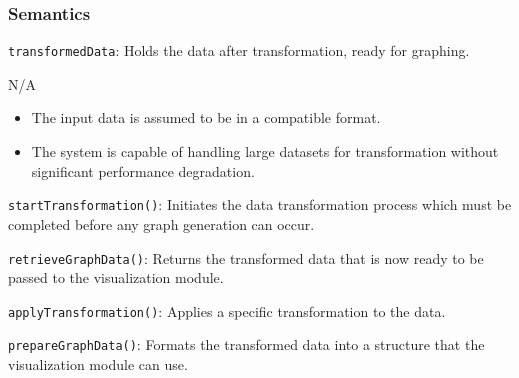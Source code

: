 \documentclass[12pt, titlepage]{article}
\begin{document}
\subsubsection{Semantics}
\begin{description}
  \item[State Variables:]
  \item \texttt{transformedData}: Holds the data after transformation, ready for graphing.
  \item[Environment Variables:] N/A

  \item[Assumptions:]
  \item
  \begin{itemize}
    \item The input data is assumed to be in a compatible format.
  \end{itemize}
  \item 
  \begin{itemize}
    \item The system is capable of handling large datasets for transformation without significant 
    performance degradation.
  \end{itemize}
  \item 

  \item[Access Routine Semantics:] 
  \item \texttt{startTransformation()}: Initiates the data transformation process which must be completed before 
  any graph generation can occur.
  \item \texttt{retrieveGraphData()}: Returns the transformed data that is now ready to be passed to the visualization 
  module.
  \item
  \item[Local Function:] 
  \item \texttt{applyTransformation()}: Applies a specific transformation to the data.
  \item \texttt{prepareGraphData()}: Formats the transformed data into a structure that the visualization module can use.
\end{description}
\end{document}
